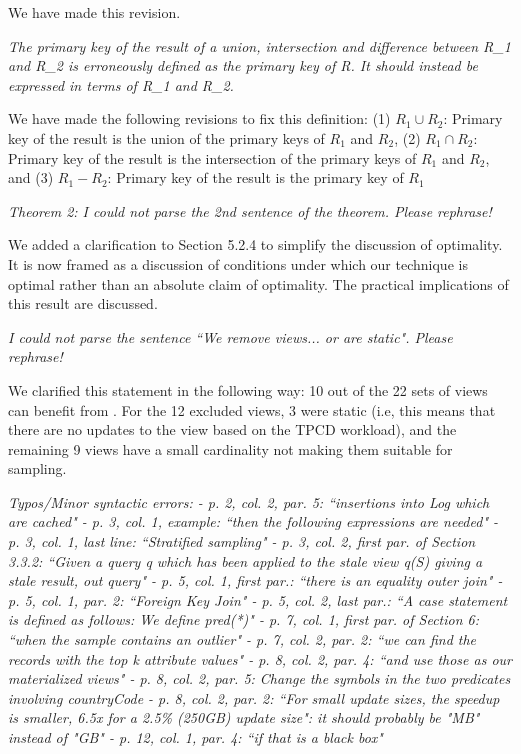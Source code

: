 We have made this revision.

\vspace{1em}
\emph{The primary key of the result of a union, intersection and difference between R\_1 and R\_2 is erroneously defined as the primary key of R. It should instead be expressed in terms of R\_1 and R\_2.}

We have made the following revisions to fix this definition:
(1) $R_1 \cup R_2$: Primary key of the result is the union of the primary keys of $R_1$ and $R_2$, (2) $R_1 \cap R_2$: Primary key of the result is the intersection of the primary keys of $R_1$ and $R_2$, and (3) $R_1 - R_2$: Primary key of the result is the primary key of $R_1$


\vspace{1em}
\emph{Theorem 2: I could not parse the 2nd sentence of the theorem. Please rephrase!}

We added a clarification to Section 5.2.4 to simplify the discussion of optimality. It is now framed as a discussion of conditions under which our technique is optimal rather than an absolute claim of optimality. The practical implications of this result are discussed.

\vspace{1em}
\emph{I could not parse the sentence ``We remove views... or are static". Please rephrase!}

We clarified this statement in the following way:
10 out of the 22 sets of views can benefit from \svc.
For the 12 excluded views, 3 were static (i.e, this means that there are no updates to the view based on the TPCD workload), and the remaining 9 views have a small cardinality not making them suitable for sampling.


\vspace{1em}
\emph{Typos/Minor syntactic errors:
- p. 2, col. 2, par. 5: ``insertions into Log which are cached"
- p. 3, col. 1, example: ``then the following expressions are needed"
- p. 3, col. 1, last line: ``Stratified sampling"
- p. 3, col. 2, first par. of Section 3.3.2: ``Given a query q which has been applied to the stale view q(S) giving a stale result, out query"
- p. 5, col. 1, first par.: ``there is an equality outer join"
- p. 5, col. 1, par. 2: ``Foreign Key Join"
- p. 5, col. 2, last par.: ``A case statement is defined as follows: We define pred(*)"
- p. 7, col. 1, first par. of Section 6: ``when the sample contains an outlier"
- p. 7, col. 2, par. 2: ``we can find the records with the top k attribute values"
- p. 8, col. 2, par. 4: ``and use those as our materialized views"
- p. 8, col. 2, par. 5: Change the symbols in the two predicates involving countryCode
- p. 8, col. 2, par. 2: ``For small update sizes, the speedup is smaller, 6.5x for a 2.5\% (250GB) update size": it should probably be "MB" instead of "GB"
- p. 12, col. 1, par. 4: ``if that is a black box"}

